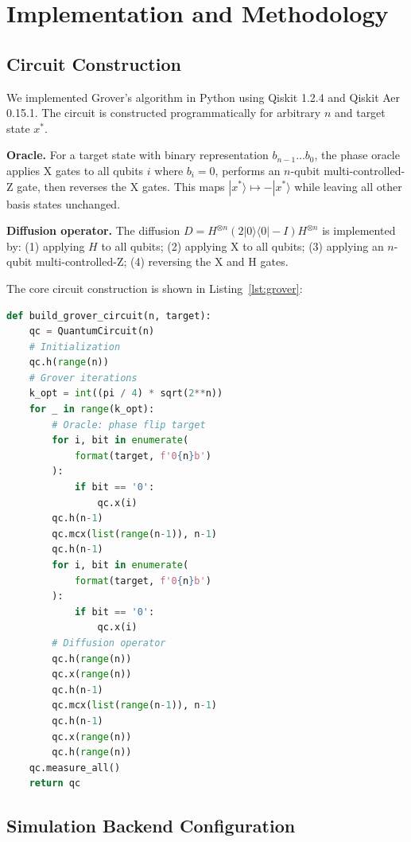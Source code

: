 \documentclass[sigconf, authorversion=true, nonacm=true]{acmart}
\begin{document}
\section{Implementation and Methodology}

\subsection{Circuit Construction}

We implemented Grover's algorithm in Python using Qiskit 1.2.4 and Qiskit Aer 0.15.1. The circuit is constructed programmatically for arbitrary $n$ and target state $x^*$.

\textbf{Oracle.} For a target state with binary representation $b_{n-1}\ldots b_0$, the phase oracle applies X gates to all qubits $i$ where $b_i = 0$, performs an $n$-qubit multi-controlled-Z gate, then reverses the X gates. This maps $|x^*\rangle \mapsto -|x^*\rangle$ while leaving all other basis states unchanged.

\textbf{Diffusion operator.} The diffusion $D = H^{\otimes n}(2|0\rangle\langle 0| - I)H^{\otimes n}$ is implemented by: (1) applying $H$ to all qubits; (2) applying X to all qubits; (3) applying an $n$-qubit multi-controlled-Z; (4) reversing the X and H gates.

The core circuit construction is shown in Listing~\ref{lst:grover}:

\begin{lstlisting}[language=Python, caption={Grover circuit construction (simplified)}, label={lst:grover}]
def build_grover_circuit(n, target):
    qc = QuantumCircuit(n)
    # Initialization
    qc.h(range(n))
    # Grover iterations
    k_opt = int((pi / 4) * sqrt(2**n))
    for _ in range(k_opt):
        # Oracle: phase flip target
        for i, bit in enumerate(
            format(target, f'0{n}b')
        ):
            if bit == '0':
                qc.x(i)
        qc.h(n-1)
        qc.mcx(list(range(n-1)), n-1)
        qc.h(n-1)
        for i, bit in enumerate(
            format(target, f'0{n}b')
        ):
            if bit == '0':
                qc.x(i)
        # Diffusion operator
        qc.h(range(n))
        qc.x(range(n))
        qc.h(n-1)
        qc.mcx(list(range(n-1)), n-1)
        qc.h(n-1)
        qc.x(range(n))
        qc.h(range(n))
    qc.measure_all()
    return qc
\end{lstlisting}

\subsection{Simulation Backend Configuration}
\end{document}
